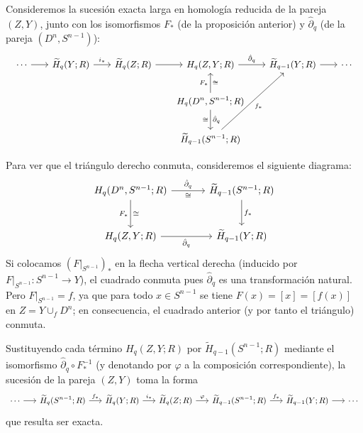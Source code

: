 \begin{dem}
Consideremos la sucesión exacta larga en homología reducida de la pareja $(Z, Y)$, junto con los isomorfismos $F_*$ (de la proposición anterior) y $\hat{\partial}_q$ (de la pareja $(D^n, S^{n-1})$):
\[
{\small
\begin{tikzcd}[column sep=1.9em, row sep=2.2em]
\cdots \arrow[r]
& \widetilde{H}_q(Y; R) \arrow[r, "i_*"]
& \widetilde{H}_q(Z; R) \arrow[r]
& H_q(Z, Y; R) \arrow[r, "\hat{\partial}_q"]
& \widetilde{H}_{q-1}(Y; R) \arrow[r]
& \cdots \\
& & & H_q(D^n, S^{n-1}; R)
    \arrow[u, "F_*", "\cong"']
    \arrow[d, "\hat{\partial}_q", "\cong"']
& & \\
& & & \widetilde{H}_{q-1}(S^{n-1}; R)
    \arrow[uur, "f_*"']
& &
\end{tikzcd}}
\]

Para ver que el triángulo derecho conmuta, consideremos el siguiente diagrama:
\[
\begin{tikzcd}[column sep=3.4em, row sep=2.6em]
H_q(D^n, S^{n-1}; R)
    \arrow[r, "\hat{\partial}_q", "\cong"']
    \arrow[d, "F_*"', "\cong"]
& \widetilde{H}_{q-1}(S^{n-1}; R)
    \arrow[d, "f_*"] \\
H_q(Z, Y; R)
    \arrow[r, "\hat{\partial}_q"']
& \widetilde{H}_{q-1}(Y; R)
\end{tikzcd}
\]
Si colocamos $(F|_{S^{n-1}})_*$ en la flecha vertical derecha (inducido por $F|_{S^{n-1}} \colon S^{n-1} \to Y$), el cuadrado conmuta pues $\hat{\partial}_q$ es una transformación natural. Pero $F|_{S^{n-1}} = f$, ya que para todo $x \in S^{n-1}$ se tiene $F(x) = [x] = [f(x)]$ en $Z = Y \cup_f D^n$; en consecuencia, el cuadrado anterior (y por tanto el triángulo) conmuta.

Sustituyendo cada término $H_q(Z, Y; R)$ por $\widetilde{H}_{q-1}(S^{n-1}; R)$ mediante el isomorfismo $\hat{\partial}_q \circ F_*^{-1}$ (y denotando por $\varphi$ a la composición correspondiente), la sucesión de la pareja $(Z, Y)$ toma la forma
\[
{\small
\begin{tikzcd}[column sep=1.55em]
\cdots \arrow[r]
& \widetilde{H}_q(S^{n-1}; R) \arrow[r, "f_*"]
& \widetilde{H}_q(Y; R) \arrow[r, "i_*"]
& \widetilde{H}_q(Z; R) \arrow[r, "\varphi"]
& \widetilde{H}_{q-1}(S^{n-1}; R) \arrow[r, "f_*"]
& \widetilde{H}_{q-1}(Y; R) \arrow[r]
& \cdots
\end{tikzcd}}
\]
que resulta ser exacta.



\end{dem}
